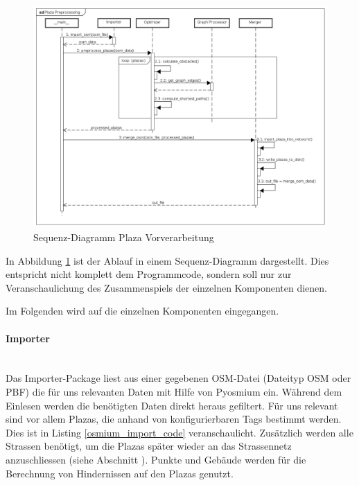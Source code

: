 \begin{figure}[ht]
    \centering
    \includegraphics[width=1\linewidth]{projectdoc/img/sequence_diagram_plaza_preprocessing.png}
    \caption[Sequenz-Diagramm Plaza Vorverarbeitung]{Sequenz-Diagramm Plaza Vorverarbeitung}
    \label{fig:sequence_diagram_plaza_preprocessing}
\end{figure}

In Abbildung \ref{fig:sequence_diagram_plaza_preprocessing} ist der Ablauf in einem Sequenz-Diagramm dargestellt. Dies entspricht nicht komplett dem Programmcode, sondern soll nur zur Veranschaulichung des Zusammenspiels der einzelnen Komponenten dienen.

Im Folgenden wird auf die einzelnen Komponenten eingegangen.

\paragraph{Importer}\label{impl:Importer}~\\
Das Importer-Package liest aus einer gegebenen \ac{OSM}-Datei (Dateityp \ac{OSM} oder \ac{PBF}) die für uns relevanten Daten mit Hilfe von Pyosmium \cite{pyosmium} ein. Während dem Einlesen werden die benötigten Daten direkt heraus gefiltert. Für uns relevant sind vor allem Plazas, die anhand von konfigurierbaren \glspl{Tag} bestimmt werden. Dies ist in Listing \ref{osmium_import_code} veranschaulicht. Zusätzlich werden alle Strassen benötigt, um die Plazas später wieder an das Strassennetz anzuschliessen (siehe Abschnitt ). Punkte und Gebäude werden für die Berechnung von Hindernissen auf den Plazas genutzt.

